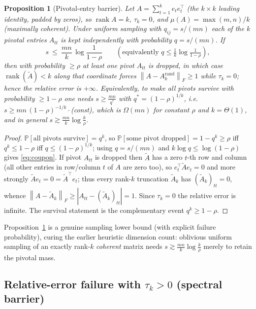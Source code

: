 \documentclass{amsart}
\newtheorem{proposition}{Proposition}
\theoremstyle{definition}
\DeclareMathOperator{\rank}{rank}
\newcommand{\Frob}[1]{\left\lVert #1\right\rVert_F}
\newcommand{\Atil}{\widetilde{A}}
\newcommand{\Prob}{\mathbb{P}}
\begin{document}
\begin{proposition}[Pivotal-entry barrier]\label{prop:coupon}
Let $A=\sum_{t=1}^{k}e_te_t^\top$ (the $k\times k$ leading identity, padded by
zeros), so $\rank A=k$, $\tau_k=0$, and $\mu(A)=\max(m,n)/k$ (maximally
coherent). Under uniform sampling with $q_{ij}=s/(mn)$ each of the $k$ pivotal
entries $A_{tt}$ is kept independently with probability $q=s/(mn)$. If
\begin{equation}\label{eq:coupon}
s\ \le\ \frac{mn}{k}\,\log\frac{1}{1-\rho}\qquad(\text{equivalently } q\le\tfrac1k\log\tfrac1{1-\rho}),
\end{equation}
then with probability $\ge\rho$ at least one pivot $A_{tt}$ is dropped, in which
case $\rank(\Atil)<k$ along that coordinate forces
$\Frob{A-A_k^{\mathrm{rand}}}\ge1$ while $\tau_k=0$; hence the relative error is
$+\infty$. Equivalently, to make all pivots survive with probability $\ge1-\rho$
one needs $s\ge\frac{mn}{q^\ast}$ with $q^\ast=(1-\rho)^{1/k}$, i.e.\
$s\ge mn\,(1-\rho)^{-1/k}\cdot$(const), which is $\Omega(mn)$ for constant
$\rho$ and $k=\Theta(1)$, and in general $s\gtrsim\frac{mn}{k}\log\frac k\rho$.
\end{proposition}

\begin{proof}
$\Prob[\text{all pivots survive}]=q^k$, so
$\Prob[\text{some pivot dropped}]=1-q^k\ge\rho$ iff $q^k\le1-\rho$ iff
$q\le(1-\rho)^{1/k}$; using $q=s/(mn)$ and $k\log q\le\log(1-\rho)$ gives
\eqref{eq:coupon}. If pivot $A_{tt}$ is dropped then $\Atil$ has a zero $t$-th
row and column (all other entries in row/column $t$ of $A$ are zero too), so
$e_t^\top\Atil e_t=0$ and more strongly $\Atil e_t=0=\Atil^\top e_t$; thus every
rank-$k$ truncation $\Atil_k$ has $(\Atil_k)_{tt}=0$, whence
$\Frob{A-\Atil_k}\ge|A_{tt}-(\Atil_k)_{tt}|=1$. Since $\tau_k=0$ the relative
error is infinite. The survival statement is the complementary event
$q^k\ge1-\rho$.
\end{proof}

Proposition~\ref{prop:coupon} is a genuine sampling lower bound (with explicit
failure probability), curing the earlier heuristic dimension count: oblivious
uniform sampling of an exactly rank-$k$ \emph{coherent} matrix needs
$s\gtrsim\frac{mn}{k}\log\frac k\rho$ merely to retain the pivotal mass.

\subsection{Relative-error failure with $\tau_k>0$ (spectral barrier)}
\end{document}
